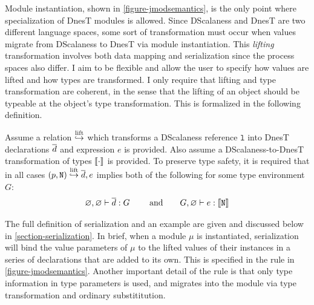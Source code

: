 Module instantiation, shown in \autoref{figure-jmodsemantics}, is the only point where
specialization of DnesT modules is allowed. Since DScalaness and DnesT are two different
language spaces, some sort of transformation must occur when values migrate from DScalaness to
DnesT via module instantiation. This \emph{lifting} transformation involves both data mapping
and serialization since the process spaces also differ. I aim to be flexible and allow the user
to specify how values are lifted and how types are transformed. I only require that lifting and
type transformation are coherent, in the sense that the lifting of an object should be typeable
at the object's type transformation. This is formalized in the following definition.
\begin{definition}
\label{def-lifting}
Assume a relation $\overset{\text{lift}}{\hookrightarrow}$ which transforms a DScalaness reference $\texttt{l}$ into DnesT
declarations $\overline{d}$ and expression $e$ is provided. Also assume a DScalaness-to-DnesT
transformation of types $\llbracket \cdot \rrbracket$ is provided. To preserve type safety, it is required that
in all cases $\mathtt{(}p,\mathtt{N)} \overset{\text{lift}}{\hookrightarrow} \overline{d}, e$ implies both of the following for some type
environment $G$:
$$
\varnothing, \varnothing \vdash \overline{d} : G \qquad \text{ and} \qquad
 G, \varnothing \vdash e : \llbracket \texttt{N} \rrbracket 
$$
\end{definition}
The full definition of serialization and an example are given and discussed below in
\autoref{section-serialization}. In brief, when a module $\mu$ is instantiated, serialization
will bind the value parameters of $\mu$ to the lifted values of their instances in a series of
declarations that are added to its own. This is specified in the  rule in
\autoref{figure-jmodsemantics}. Another important detail of the  rule is that
only type information in type parameters is used, and migrates into the module via type
transformation and ordinary substititution.

\jmodsemanticsfig

